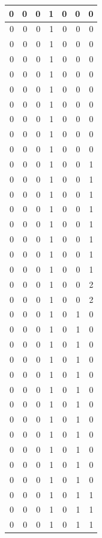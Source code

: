 \documentclass[
  12pt,
]{krantz}
\begin{document}
\begin{tabular}{r|r|r|r|r|r|r}
\hline
0 & 0 & 0 & 1 & 0 & 0 & 0\\
\hline
0 & 0 & 0 & 1 & 0 & 0 & 0\\
\hline
0 & 0 & 0 & 1 & 0 & 0 & 0\\
\hline
0 & 0 & 0 & 1 & 0 & 0 & 0\\
\hline
0 & 0 & 0 & 1 & 0 & 0 & 0\\
\hline
0 & 0 & 0 & 1 & 0 & 0 & 0\\
\hline
0 & 0 & 0 & 1 & 0 & 0 & 0\\
\hline
0 & 0 & 0 & 1 & 0 & 0 & 0\\
\hline
0 & 0 & 0 & 1 & 0 & 0 & 0\\
\hline
0 & 0 & 0 & 1 & 0 & 0 & 0\\
\hline
0 & 0 & 0 & 1 & 0 & 0 & 1\\
\hline
0 & 0 & 0 & 1 & 0 & 0 & 1\\
\hline
0 & 0 & 0 & 1 & 0 & 0 & 1\\
\hline
0 & 0 & 0 & 1 & 0 & 0 & 1\\
\hline
0 & 0 & 0 & 1 & 0 & 0 & 1\\
\hline
0 & 0 & 0 & 1 & 0 & 0 & 1\\
\hline
0 & 0 & 0 & 1 & 0 & 0 & 1\\
\hline
0 & 0 & 0 & 1 & 0 & 0 & 1\\
\hline
0 & 0 & 0 & 1 & 0 & 0 & 2\\
\hline
0 & 0 & 0 & 1 & 0 & 0 & 2\\
\hline
0 & 0 & 0 & 1 & 0 & 1 & 0\\
\hline
0 & 0 & 0 & 1 & 0 & 1 & 0\\
\hline
0 & 0 & 0 & 1 & 0 & 1 & 0\\
\hline
0 & 0 & 0 & 1 & 0 & 1 & 0\\
\hline
0 & 0 & 0 & 1 & 0 & 1 & 0\\
\hline
0 & 0 & 0 & 1 & 0 & 1 & 0\\
\hline
0 & 0 & 0 & 1 & 0 & 1 & 0\\
\hline
0 & 0 & 0 & 1 & 0 & 1 & 0\\
\hline
0 & 0 & 0 & 1 & 0 & 1 & 0\\
\hline
0 & 0 & 0 & 1 & 0 & 1 & 0\\
\hline
0 & 0 & 0 & 1 & 0 & 1 & 0\\
\hline
0 & 0 & 0 & 1 & 0 & 1 & 0\\
\hline
0 & 0 & 0 & 1 & 0 & 1 & 1\\
\hline
0 & 0 & 0 & 1 & 0 & 1 & 1\\
\hline
0 & 0 & 0 & 1 & 0 & 1 & 1\\

\end{tabular}
\end{document}
